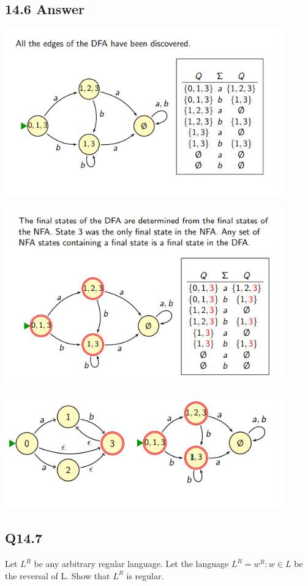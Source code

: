 \documentclass{article}
\begin{document}
\subsection*{14.6 Answer}
\begin{center}
    \includegraphics[width=12cm]{7.png}
\end{center}
\begin{center}
    \includegraphics[width=12cm]{8.png}
\end{center}
\begin{center}
    \includegraphics[width=12cm]{9.png}
\end{center}
\newpage
\subsection*{Q14.7}
Let $L^R$ be any arbitrary regular language. Let the language $L^R = {w^R : w \in L}$ be the reversal of L.
Show that $L^R$ is regular.
\newpage
\end{document}
